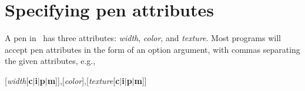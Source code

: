 \section{Specifying pen attributes}

%
%
\label{sec:pen}
A pen in \GMT\ has three attributes: {\it width}, {\it color},
and {\it texture}.  Most programs will accept pen attributes in
the form of an option argument, with commas separating the
given attributes, e.g.,

\vspace{\baselineskip} 

\par {}[{\it width}[{\bf c$|$i$|$p$|$m}]],[{\it color}],[{\it texture}[{\bf c$|$i$|$p$|$m}]]\par 

